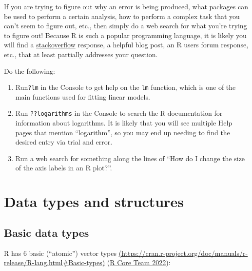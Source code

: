 \documentclass[
]{book}
\providecommand{\tightlist}{%
  \setlength{\itemsep}{0pt}\setlength{\parskip}{0pt}}
\theoremstyle{definition}
\theoremstyle{definition}
\theoremstyle{definition}
\theoremstyle{definition}
\theoremstyle{remark}
\begin{document}
If you are trying to figure out why an error is being produced, what packages can be used to perform a certain analysis, how to perform a complex task that you can't seem to figure out, etc., then simply do a web search for what you're trying to figure out! Because R is such a popular programming language, it is likely you will find a \href{https://www.stackoverflow.com}{stackoverflow} response, a helpful blog post, an R users forum response, etc., that at least partially addresses your question.

\begin{yourturn}

Do the following:

\begin{enumerate}
\def\labelenumi{\arabic{enumi}.}
\tightlist
\item
  Run\texttt{?lm} in the Console to get help on the \texttt{lm} function, which is one of the main functions used for fitting linear models.
\item
  Run \texttt{??logarithms} in the Console to search the R documentation for information about logarithms. It is likely that you will see multiple Help pages that mention ``logarithm'', so you may end up needing to find the desired entry via trial and error.
\item
  Run a web search for something along the lines of ``How do I change the size of the axis labels in an R plot?''.
\end{enumerate}

\end{yourturn}

\hypertarget{data-types-and-structures}{%
\section{Data types and structures}\label{data-types-and-structures}}

\hypertarget{basic-data-types}{%
\subsection{Basic data types}\label{basic-data-types}}

R has 6 basic (``atomic'') vector types \href{https://cran.r-project.org/doc/manuals/r-release/R-lang.html\#Basic-types}{(https://cran.r-project.org/doc/manuals/r-release/R-lang.html\#Basic-types)} (\protect\hyperlink{ref-R-base}{R Core Team 2022}):
\end{document}
